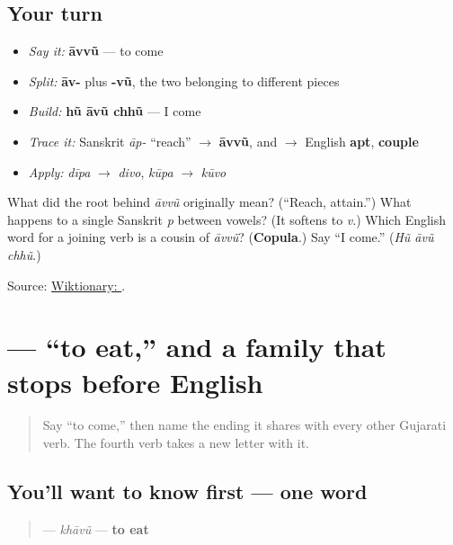 \subsection*{Your turn}
\begin{itemize}
\raggedright
  \item \emph{Say it:} \textbf{āvvũ} — to come
  \item \emph{Split:} \textbf{āv-} plus \textbf{-vũ}, the two  belonging to different pieces
  \item \emph{Build:} \textbf{hũ āvũ chhũ} — I come
  \item \emph{Trace it:} Sanskrit \emph{āp-} \textquotedblleft{}reach\textquotedblright{} $\to$ \textbf{āvvũ}, and $\to$ English \textbf{apt}, \textbf{couple}
  \item \emph{Apply:} \emph{dīpa} $\to$ \emph{divo}, \emph{kūpa} $\to$ \emph{kūvo}
\end{itemize}

\begin{tcolorbox}[breakable,colback=teal!4,colframe=teal!35!black,title={Before you move on}]
What did the root behind \emph{āvvũ} originally mean? (\textquotedblleft{}Reach, attain.\textquotedblright{}) What happens to a single Sanskrit \emph{p} between vowels? (It softens to \emph{v}.) Which English word for a joining verb is a cousin of \emph{āvvũ}? (\textbf{Copula}.) Say \textquotedblleft{}I come.\textquotedblright{} (\emph{Hũ āvũ chhũ}.)

Source: \href{https://en.wiktionary.org/wiki/\%E0\%AA\%86\%E0\%AA\%B5\%E0\%AA\%B5\%E0\%AB\%81\%E0\%AA\%82}{Wiktionary: }.
\end{tcolorbox}
\section[khāvũ]{ — \textquotedblleft{}to eat,\textquotedblright{} and a family that stops before English}

\label{lesson:GU-C07-khaavun}



\begin{quote}
Say \textquotedblleft{}to come,\textquotedblright{} then name the ending it shares with every other Gujarati verb. The fourth verb takes a new letter with it.
\end{quote}

\subsection*{You'll want to know first — one word}
\begin{quote}
\textbf{} — \emph{khāvũ} — \textbf{to eat}
\end{quote}

